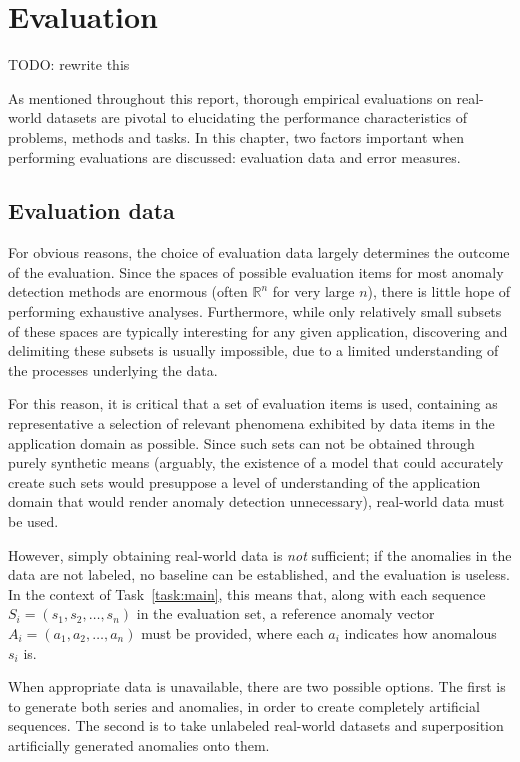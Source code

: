 \section{Evaluation}
\label{ch:evaluation}

TODO: rewrite this

As mentioned throughout this report, thorough empirical evaluations on real-world datasets are pivotal to elucidating the performance characteristics of problems, methods and tasks. In this chapter, two factors important when performing evaluations are discussed: evaluation data and error measures.

\subsection{Evaluation data}
\label{sect:evaluation_data}

For obvious reasons, the choice of evaluation data largely determines the outcome of the evaluation. Since the spaces of possible evaluation items for most anomaly detection methods are enormous (often $\mathbb{R}^n$ for very large $n$), there is little hope of performing exhaustive analyses. Furthermore, while only relatively small subsets of these spaces are typically interesting for any given application, discovering and delimiting these subsets is usually impossible, due to a limited understanding of the processes underlying the data.

For this reason, it is critical that a set of evaluation items is used, containing as representative a selection of relevant phenomena exhibited by data items in the application domain as possible. Since such sets can not be obtained through purely synthetic means (arguably, the existence of a model that could accurately create such sets would presuppose a level of understanding of the application domain that would render anomaly detection unnecessary), real-world data must be used.

However, simply obtaining real-world data is \emph{not} sufficient; if the anomalies in the data are not labeled, no baseline can be established, and the evaluation is useless. In the context of Task~\ref{task:main}, this means that, along with each sequence $S_i = (s_1, s_2, \dots, s_n)$ in the evaluation set, a reference anomaly vector $A_i = (a_1, a_2, \dots, a_n)$ must be provided, where each $a_i$ indicates how anomalous $s_i$ is.

When appropriate data is unavailable, there are two possible options. The first is to generate both series and anomalies, in order to create completely artificial sequences. The second is to take unlabeled real-world datasets and superposition artificially generated anomalies onto them.

